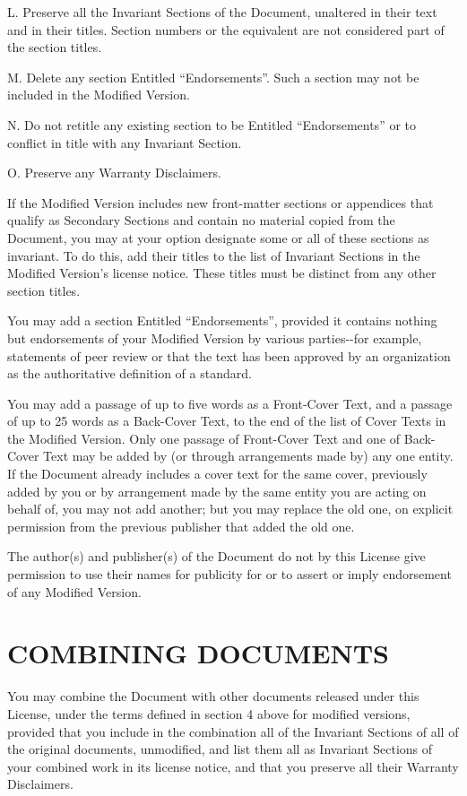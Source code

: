 L. Preserve all the Invariant Sections of the Document, unaltered in
their text and in their titles. Section numbers or the equivalent are
not considered part of the section titles.

M. Delete any section Entitled ``Endorsements''. Such a section may not
be included in the Modified Version.

N. Do not retitle any existing section to be Entitled ``Endorsements''
or to conflict in title with any Invariant Section.

O. Preserve any Warranty Disclaimers.

If the Modified Version includes new front-matter sections or appendices
that qualify as Secondary Sections and contain no material copied from
the Document, you may at your option designate some or all of these
sections as invariant. To do this, add their titles to the list of
Invariant Sections in the Modified Version's license notice. These
titles must be distinct from any other section titles.

You may add a section Entitled ``Endorsements'', provided it contains
nothing but endorsements of your Modified Version by various
parties-\/-for example, statements of peer review or that the text has
been approved by an organization as the authoritative definition of a
standard.

You may add a passage of up to five words as a Front-Cover Text, and a
passage of up to 25 words as a Back-Cover Text, to the end of the list
of Cover Texts in the Modified Version. Only one passage of Front-Cover
Text and one of Back-Cover Text may be added by (or through arrangements
made by) any one entity. If the Document already includes a cover text
for the same cover, previously added by you or by arrangement made by
the same entity you are acting on behalf of, you may not add another;
but you may replace the old one, on explicit permission from the
previous publisher that added the old one.

The author(s) and publisher(s) of the Document do not by this License
give permission to use their names for publicity for or to assert or
imply endorsement of any Modified Version.

\section{COMBINING DOCUMENTS}\label{combining-documents}

You may combine the Document with other documents released under this
License, under the terms defined in section 4 above for modified
versions, provided that you include in the combination all of the
Invariant Sections of all of the original documents, unmodified, and
list them all as Invariant Sections of your combined work in its license
notice, and that you preserve all their Warranty Disclaimers.

